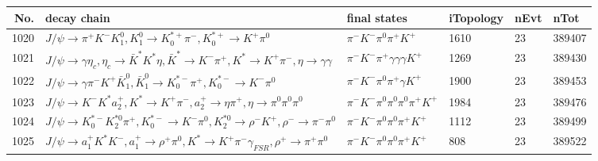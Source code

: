 \begin{table}[htbp] 
\begin{center}
\begin{small}
\begin{tabular}{rlllll}\hline\hline
 No. & decay chain & final states &  iTopology & nEvt & nTot \\\hline
1020&$J/\psi       \rightarrow \pi^{+}        K^{-}          K_1^{0}        , K_1^{0}         \rightarrow K_{0}^{*+}     \pi^{-}        , K_{0}^{*+}      \rightarrow K^{+}          \pi^{0}        $&$\pi^{-}        K^{-}          \pi^{0}        \pi^{+}        K^{+}          $& 1610&   23&389407\\
1021&$J/\psi       \rightarrow \gamma       \eta_{c}    , \eta_{c}     \rightarrow \bar{K}^{*}   K^{*}          \eta          , \bar{K}^{*}    \rightarrow K^{-}          \pi^{+}        , K^{*}           \rightarrow K^{+}          \pi^{-}        , \eta           \rightarrow \gamma       \gamma       $&$\pi^{-}        K^{-}          \pi^{+}        \gamma       \gamma       \gamma       K^{+}          $& 1269&   23&389430\\
1022&$J/\psi       \rightarrow \gamma       \pi^{-}        K^{+}          \bar{K}_1^{0} , \bar{K}_1^{0}  \rightarrow K_{0}^{*-}     \pi^{+}        , K_{0}^{*-}      \rightarrow K^{-}          \pi^{0}        $&$\pi^{-}        K^{-}          \pi^{0}        \pi^{+}        \gamma       K^{+}          $& 1900&   23&389453\\
1023&$J/\psi       \rightarrow K^{-}          K^{*}          a_{2}^{+}      , K^{*}           \rightarrow K^{+}          \pi^{-}        , a_{2}^{+}       \rightarrow \eta          \pi^{+}        , \eta           \rightarrow \pi^{0}        \pi^{0}        \pi^{0}        $&$\pi^{-}        K^{-}          \pi^{0}        \pi^{0}        \pi^{0}        \pi^{+}        K^{+}          $& 1984&   23&389476\\
1024&$J/\psi       \rightarrow K_{0}^{*-}     K_2^{*0}       \pi^{+}        , K_{0}^{*-}      \rightarrow K^{-}          \pi^{0}        , K_2^{*0}        \rightarrow \rho^{-}      K^{+}          , \rho^{-}       \rightarrow \pi^{-}        \pi^{0}        $&$\pi^{-}        K^{-}          \pi^{0}        \pi^{0}        \pi^{+}        K^{+}          $& 1112&   23&389499\\
1025&$J/\psi       \rightarrow a_{1}^{+}      K^{*}          K^{-}          , a_{1}^{+}       \rightarrow \rho^{+}      \pi^{0}        , K^{*}           \rightarrow K^{+}          \pi^{-}        \gamma_{FSR} , \rho^{+}       \rightarrow \pi^{+}        \pi^{0}        $&$\pi^{-}        K^{-}          \pi^{0}        \pi^{0}        \pi^{+}        K^{+}          $&  808&   23&389522\\

\end{tabular}
\end{small}
\end{center}
\end{table}
